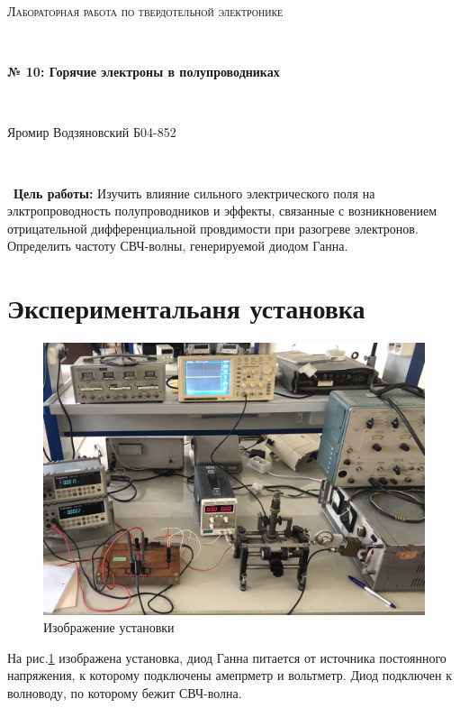 \documentclass[a4paper]{article}
\begin{document}
\graphicspath{ {pictures/} }
\begin{center}
    {\scshape\Large Лабораторная работа по твердотельной электронике} \par

    \

    {\huge\bfseries № 10: Горячие электроны в полупроводниках} \par 

    \

    {\large Яромир Водзяновский Б04-852}
\end{center}

\

\
\textbf{Цель работы:} Изучить влияние сильного электрического поля на элктропроводность полупроводников и эффекты, связанные с возникновением отрицательной дифференциальной провдимости при 
разогреве электронов. Определить частоту СВЧ-волны, генерируемой диодом Ганна. 


\section{Экспериментальаня установка}

\begin{figure}[H]
    \begin{center}
        \includegraphics[scale = 0.1]{setup.jpg}
        \caption{Изображение установки}
        \label{setup}
    \end{center}
\end{figure}

На рис.\ref{setup} изображена установка, диод Ганна питается от источника постоянного напряжения, к которому подключены 
амепрметр и вольтметр. Диод подключен к волноводу, по которому бежит СВЧ-волна.
\end{document}

